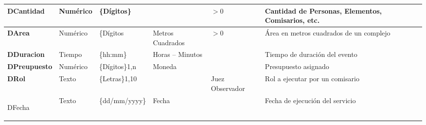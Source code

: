 \begin{table}[H]
{\begin{tabular}{>{\bfseries}m{2.5cm} >{\centering}m{2cm} >{}m{4cm} >{\arraybackslash}m{2cm}>{\arraybackslash}m{2.5cm}>{\arraybackslash}m{6cm}}
    DCantidad   & Numérico          & \{Dígitos\}                          &                                     & $ > 0$                               & Cantidad de Personas, Elementos, Comisarios, etc.       \\\hline
    DArea       & Numérico          & \{Dígitos\                           & Metros Cuadrados                    & $ > 0$                               & Área en metros cuadrados de un complejo                 \\\hline
    DDuracion   & Tiempo            & \{hh:mm\}                            & Horas -- Minutos                    &                                      & Tiempo de duración del evento                           \\\hline
    DPreupuesto & Numérico          & \{Dígitos\}1,n                       & Moneda                              &                                      & Presupuesto asignado                                    \\\hline
    DRol        & Texto             & \{Letras\}1,10                       &                                     & Juez \newline Observador             & Rol a ejecutar por un comisario                         \\\hline
    
    DFecha      & Texto             & \{dd/mm/yyyy\}                       & Fecha                               &                                      & Fecha de ejecución del servicio                         \\\bottomrule
    \end{tabular}
}
\end{table}

